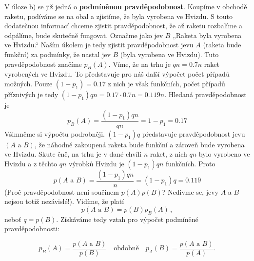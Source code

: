 \begin{mdframed}[style=mdexam]
\begin{example}
      V úloze b) se již jedná o \textbf{podmíněnou pravděpodobnost}. Koupíme v obchodě raketu,
      podíváme se na obal a zjistíme, že byla vyrobena ve Hvizdu. S touto dodatečnou informací
      chceme zjistit pravděpodobnost, že až raketu rozbalíme a odpálíme, bude skutečně fungovat.
      Označme jako jev \(B\) „Raketa byla vyrobena ve Hvizdu.“ Naším úkolem je tedy zjistit
      pravděpodobnost jevu \(A\) (raketa bude funkční) za podmínky, že nastal jev \(B\) (byla
      vyrobena ve Hvizdu). Tuto pravděpodobnost značíme \(p_B(A)\). Víme, že na trhu je \(qn =
      \num{0.7}n\) raket vyrobených ve Hvizdu. To představuje pro náš další výpočet počet případů
      možných. Pouze \((1 - p_1) = \num{0.17}\) z nich je však funkčních, počet případů příznivých
      je tedy \((1 - p_1)qn = \num{0.17}\cdot\num{0.7}n = \num{0.119}n\). Hledaná pravděpodobnost je
      \begin{equation*}
        p_B(A) = \dfrac{(1 - p_1)qn}{qn} = 1 - p_1 = \num{0.17}
      \end{equation*}
      Všimněme si výpočtu podrobněji. \((1 - p_1)q\) představuje pravděpodobnost jevu \((A\text{ a
      }B)\), že náhodně zakoupená raketa bude funkční a zároveň bude vyrobena ve Hvizdu. Skute čně,
      na trhu je v dané chvíli \(n\) raket, z nich \(qn\) bylo vyrobeno ve Hvizdu a z těchto \(qn\)
      výrobků Hvizdu je \((1 - p_1)qn\) funkčních. Proto 
      \begin{equation*}
        p(A\text{ a }B) = \dfrac{(1 - p_1)qn}{n} = (1 - p_1)q = \num{0.119}
      \end{equation*}
      (Proč pravděpodobnost není součinem \(p(A)p(B)\)? Nedivme se, jevy \(A\) a \(B\) nejsou totiž
      nezávislé!). Vidíme, že platí
      \begin{equation*}
        \boxed{p(A\text{ a }B) = p(B)p_B(A)}\,,
      \end{equation*}
      neboť \(q = p(B)\). Získáváme tedy vztah pro výpočet podmíněné pravděpodobnosti:
      \begin{mdframed}[style=highlight]
        \begin{equation}\label{mai:eq057}
          p_B(A) = \dfrac{p(A\text{ a }B)}{p(B)} \quad\text{obdobně}\quad
          p_A(B) = \dfrac{p(A\text{ a }B)}{p(A)}.
        \end{equation}
      \end{mdframed}
    

\end{example}
\end{mdframed}
